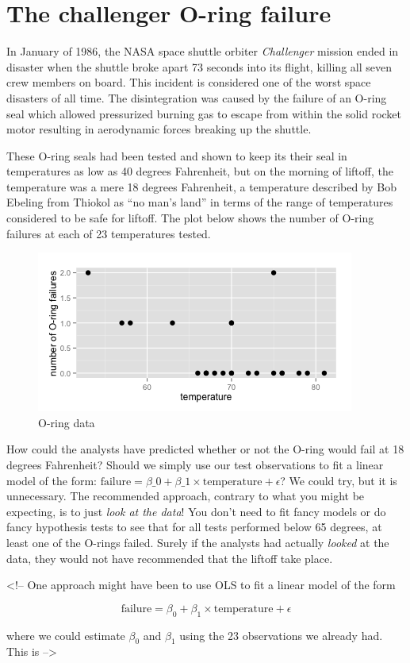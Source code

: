 

\chapter{The challenger O-ring failure}
\label{ch:gls}





In January of 1986, the NASA space shuttle orbiter \textit{Challenger} mission ended in disaster when the shuttle broke apart 73 seconds into its flight, killing all seven crew members on board. This incident is considered one of the worst space disasters of all time. The disintegration was caused by the failure of an O-ring seal which allowed pressurized burning gas to escape from within the solid rocket motor resulting in aerodynamic forces breaking up the shuttle.

These O-ring seals had been tested and shown to keep its their seal in temperatures as low as 40 degrees Fahrenheit, but on the morning of liftoff, the temperature was a mere 18 degrees Fahrenheit, a temperature described by Bob Ebeling from Thiokol as ``no man's land'' in terms of the range of temperatures considered to be safe for liftoff. The plot below shows the number of O-ring failures at each of 23 temperatures tested.





\begin{figure}[H]
\begin{center}
\includegraphics[scale=0.8]{oring.png}
\end{center}
\caption{O-ring data}
\label{fig:oring}
\end{figure}



How could the analysts have predicted whether or not the O-ring would fail at 18 degrees Fahrenheit? Should we simply use our test observations to fit a linear model of the form: $\text{failure} = \beta\_0 + \beta\_1 \times \text{temperature} + \epsilon$? We could try, but it is unnecessary. The recommended approach, contrary to what you might be expecting, is to just \textit{look at the data}! You don't need to fit fancy models or do fancy hypothesis tests to see that for all tests performed below 65 degrees, at least one of the O-rings failed. Surely if the analysts had actually \textit{looked} at the data, they would not have recommended that the liftoff take place.


<!--
One approach might have been to use OLS to fit a linear model of the form

$$\text{failure} = \beta_0 + \beta_1 \times \text{temperature} + \epsilon$$

where we could estimate $\beta_0$ and $\beta_1$ using the 23 observations we already had. This is 
-->




